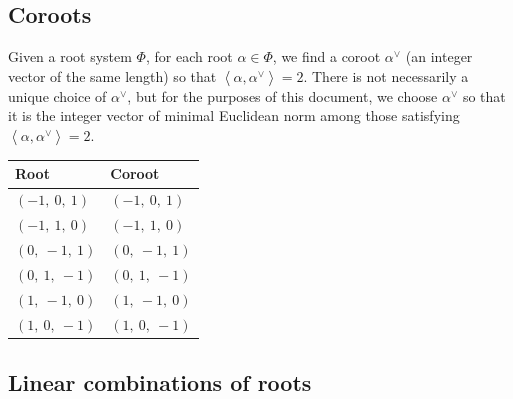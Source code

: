 \documentclass[11pt]{article}
\newcommand{\la}{\left\langle}
\newcommand{\ra}{\right\rangle}
\theoremstyle{definition}
\newif\ifsummablepairs
\begin{document}
\subsection{Coroots}

Given a root system $\Phi$, for each root $\alpha \in \Phi$, we find a coroot $\alpha^\vee$ (an integer vector of the same length) so that $\la \alpha, \alpha^\vee \ra = 2$. There is not necessarily a unique choice of $\alpha^\vee$, but for the purposes of this document, we choose $\alpha^\vee$ so that it is the integer vector of minimal Euclidean norm among those satisfying $\la \alpha, \alpha^\vee \ra = 2$.

\bigskip

\noindent \begin{tabular}{|l|l|}
    \hline
    \textbf{Root} & \textbf{Coroot} \\
    \hline
    $\left( -1, \  0, \  1\right)$ & $\left( -1, \  0, \  1\right)$ \\
    \hline
    $\left( -1, \  1, \  0\right)$ & $\left( -1, \  1, \  0\right)$ \\
    \hline
    $\left( 0, \  -1, \  1\right)$ & $\left( 0, \  -1, \  1\right)$ \\
    \hline
    $\left( 0, \  1, \  -1\right)$ & $\left( 0, \  1, \  -1\right)$ \\
    \hline
    $\left( 1, \  -1, \  0\right)$ & $\left( 1, \  -1, \  0\right)$ \\
    \hline
    $\left( 1, \  0, \  -1\right)$ & $\left( 1, \  0, \  -1\right)$ \\
    \hline
\end{tabular}


\ifsummablepairs
\subsection{Linear combinations of roots}
\end{document}
